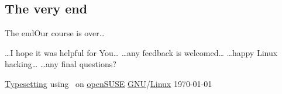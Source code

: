 \documentclass[compress, ucs, xelatex, 11pt, xcolor=svgnames,
  hyperref={
    bookmarks=true,
    unicode=true,
    colorlinks=true,
    pdftitle={Linux, command line and MetaCentrum},
    plainpages=false,
    pdfauthor={Vojtech Zeisek},
    pdfsubject={Course about use of Linux command line, writing shell scripts and using MetaCentrum of CESNET},
    pdfcreator={XeLaTeX},
    pdfkeywords={Linux, GNU, BASH, shell, command line, MetaCentrum},
    linkcolor=DarkRed,
    anchorcolor=DarkBlue,
    citecolor=Indigo,
    filecolor=NavyBlue,
    menucolor=DarkMagenta,
    urlcolor=DarkBlue,
    pdftex},
  url={hyphens, lowtilde} %
  ]{beamer}
\begin{document}
\subsection{The very end}

\begin{frame}{The end}{Our course is over\ldots}
  \begin{center}
    \ldots I hope it was helpful for You\ldots
    \vfill
    \ldots any feedback is welcomed\ldots
    \vfill
    \ldots happy Linux hacking\ldots
    \vfill
    \ldots any final questions?
    \vfill
  \end{center}
  \begin{flushright}
    \begin{tiny}
    \href{https://en.wikipedia.org/wiki/XeTeX}{Typesetting} using \XeLaTeX~on \href{https://www.opensuse.org/}{openSUSE} \href{https://en.wikipedia.org/wiki/GNU}{GNU}/\href{https://en.wikipedia.org/wiki/Linux}{Linux} \today
    \end{tiny}
  \end{flushright}
\end{frame}
\end{document}
